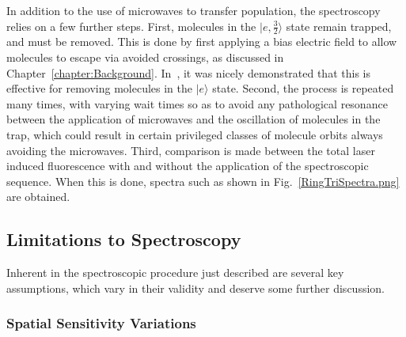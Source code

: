 \documentclass[defaultstyle,11pt]{thesis}
\begin{document}

In addition to the use of microwaves to transfer population, the spectroscopy relies on a few further steps.
First, molecules in the $|e, \frac{3}{2}\rangle$ state remain trapped, and must be removed.
This is done by first applying a bias electric field to allow molecules to escape via avoided crossings, as discussed in Chapter~\ref{chapter:Background}.
In~\cite{stuhl2012uwave}, it was nicely demonstrated that this is effective for removing molecules in the $|e\rangle$ state.
Second, the process is repeated many times, with varying wait times so as to avoid any pathological resonance between the application of microwaves and the oscillation of molecules in the trap, which could result in certain privileged classes of molecule orbits always avoiding the microwaves.
Third, comparison is made between the total laser induced fluorescence with and without the application of the spectroscopic sequence.
When this is done, spectra such as shown in Fig.~\ref{RingTriSpectra.png} are obtained.


\subsection{Limitations to Spectroscopy}

Inherent in the spectroscopic procedure just described are several key assumptions, which vary in their validity and deserve some further discussion.

\subsubsection{Spatial Sensitivity Variations}
\end{document}
